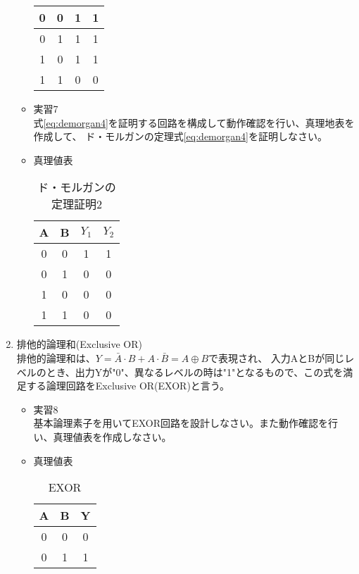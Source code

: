 \documentclass[dvipdfmx,a4paper]{jsarticle}
\begin{document}
\begin{enumerate}
\begin{itemize}
\begin{table}[H]
\begin{tabular}{|c|c|c|c|}
										0 & 0 & 1 & 1 \\ \hline
										0 & 1 & 1 & 1\\ \hline
										1 & 0 & 1 & 1\\ \hline
										1 & 1 & 0 & 0\\ \hline
									\end{tabular}
								\end{table}
							\item 実習7 \\
								式\ref{eq:demorgan4}を証明する回路を構成して動作確認を行い、真理地表を作成して、
								ド・モルガンの定理式\ref{eq:demorgan4}を証明しなさい。
							\item 真理値表
								\begin{table}[H]
									\center
									\caption{ド・モルガンの定理証明2 \label{tb:demorgan2}}
									\begin{tabular}{|c|c|c|c|}
										\hline
										A & B & $Y_1$ &$Y_2$ \\ \hline
										0 & 0 & 1 & 1 \\ \hline
										0 & 1 & 0 & 0\\ \hline
										1 & 0 & 0 & 0\\ \hline
										1 & 1 & 0 & 0\\ \hline
									\end{tabular}
								\end{table}
						\end{itemize}
					\item 排他的論理和(Exclusive OR) \\
						排他的論理和は、$Y = \bar{A} \cdot B + A \cdot \bar{B} = A \oplus B$で表現され、
						入力AとBが同じレベルのとき、出力Yが"0"、異なるレベルの時は"1"となるもので、この式を満足する論理回路をExclusive OR(EXOR)と言う。
						\begin{itemize}
							\item 実習8\\
								基本論理素子を用いてEXOR回路を設計しなさい。また動作確認を行い、真理値表を作成しなさい。
							\item 真理値表
								\begin{table}[H]
									\center
									\caption{EXOR \label{tb:exor}}
									\begin{tabular}{|c|c|c|}
										\hline
										A & B & Y\\ \hline
										0 & 0 & 0\\ \hline
										0 & 1 & 1\\ \hline

\end{tabular}
\end{table}
\end{itemize}
\end{enumerate}
\end{document}
